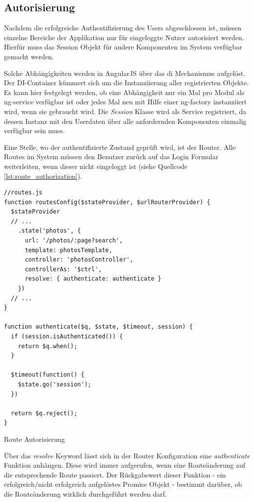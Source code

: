 \subsection{Autorisierung}

Nachdem die erfolgreiche Authentifizierung des Users abgeschlossen ist, müssen einzelne Bereiche der Applikation nur für eingeloggte Nutzer autorisiert werden. Hierfür muss das Session Objekt für andere Komponenten im System verfügbar gemacht werden.

Solche Abhängigkeiten werden in AngularJS über das \gls{di} Mechanismus aufgelöst. Der DI-Con­tai­ner kümmert sich um die Instanziierung aller registrierten Objekte. Es kann hier festgelegt werden, ob eine Abhängigkeit nur ein Mal pro Modul als \gls{ng-service} verfügbar ist oder jedes Mal neu mit Hilfe einer \gls{ng-factory} instanziiert wird, wenn sie gebraucht wird.
Die \emph{Session} Klasse wird als Service registriert, da dessen Instanz mit den Userdaten über alle anfordernden Komponenten einmalig verfügbar sein muss.

Eine Stelle, wo der authentifizierte Zustand geprüft wird, ist der Router. Alle Routes im System müssen den Benutzer zurück auf das Login Formular weiterleiten, wenn dieser nicht eingeloggt ist (siehe Quellcode \ref{lst:route_authorization}).

\begin{listing}[H]
\begin{verbatim}
//routes.js
function routesConfig($stateProvider, $urlRouterProvider) {
  $stateProvider
  // ...
    .state('photos', {
      url: '/photos/:page?search',
      template: photosTemplate,
      controller: 'photosController',
      controllerAs: '$ctrl',
      resolve: { authenticate: authenticate }
    })
  // ...
}

function authenticate($q, $state, $timeout, session) {
  if (session.isAuthenticated()) {
    return $q.when();
  }

  $timeout(function() {
    $state.go('session');
  })

  return $q.reject();
}

\end{verbatim}
\caption{Route Autorisierung}
\label{lst:route_authorization}
\end{listing}

Über das \emph{resolve} Keyword lässt sich in der Router Konfiguration eine \emph{authenticate} Funktion anhängen. Diese wird immer aufgerufen, wenn eine Routeänderung auf die entsprechende Route passiert. Der Rückgabewert dieser Funktion - ein erfolgreich/nicht erfolgreich aufgelöstes Promise Objekt - bestimmt darüber, ob die Routeänderung wirklich durchgeführt werden darf.

